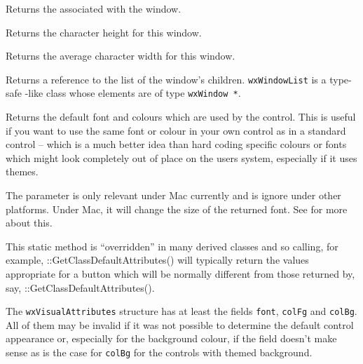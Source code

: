 Returns the  associated with the window.


\label{wxwindowgetcharheight}


Returns the character height for this window.


\label{wxwindowgetcharwidth}


Returns the average character width for this window.


\label{wxwindowgetchildren}



Returns a reference to the list of the window's children. \texttt{wxWindowList} 
is a type-safe -like class whose elements are of type
\texttt{wxWindow *}.


\label{wxwindowgetclassdefaultattributes}


Returns the default font and colours which are used by the control. This is
useful if you want to use the same font or colour in your own control as in a
standard control -- which is a much better idea than hard coding specific
colours or fonts which might look completely out of place on the users
system, especially if it uses themes.

The  parameter is only relevant under Mac currently and is
ignore under other platforms. Under Mac, it will change the size of the
returned font. See 
for more about this.

This static method is ``overridden'' in many derived classes and so calling,
for example, ::GetClassDefaultAttributes() will typically
return the values appropriate for a button which will be normally different
from those returned by, say, ::GetClassDefaultAttributes().

The \texttt{wxVisualAttributes} structure has at least the fields
\texttt{font}, \texttt{colFg} and \texttt{colBg}. All of them may be invalid
if it was not possible to determine the default control appearance or,
especially for the background colour, if the field doesn't make sense as is
the case for \texttt{colBg} for the controls with themed background.

